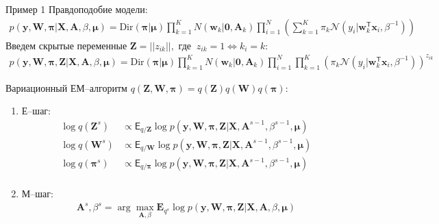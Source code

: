 \documentclass[9pt,pdf,hyperref={unicode}]{beamer}
\begin{document}
\begin{frame}{Пример 1}
\justifying
Правдоподобие модели:
	\begin{equation}
	\label{sl:3:eq:1}
		\begin{aligned}
			p(\textbf{y}, \textbf{W}, \bm{\pi}|\textbf{X}, \textbf{A}, \beta, \bm{\mu}) = \text{Dir}(\bm{\pi}|\bm{\mu})
			\prod_{k=1}^{K}N(\textbf{w}_k|\textbf{0}, \textbf{A}_k)
			\prod_{i=1}^{N}\left(\sum_{k=1}^{K}\pi_k\mathcal{N}(y_i|\textbf{w}_k^{\mathsf{T}}\textbf{x}_i, \beta^{-1})\right)
		\end{aligned}
	\end{equation}
Введем скрытые переменные $\textbf{Z} = ||z_{ik}||,$ где $~z_{ik} = 1 \Leftrightarrow k_i=k$:
	\begin{equation}
	\label{sl:3:eq:2}
		\begin{aligned}
			p(\textbf{y}, \textbf{W}, \bm{\pi}, \textbf{Z}|\textbf{X}, \textbf{A}, \beta, \bm{\mu}) = \text{Dir}(\bm{\pi}|\bm{\mu})
			\prod_{k=1}^{K}N(\textbf{w}_k|\textbf{0}, \textbf{A}_k)
			\prod_{i=1}^{N}\prod_{k=1}^{K}\left(\pi_k\mathcal{N}(y_i|\textbf{w}_k^{\mathsf{T}}\textbf{x}_i, \beta^{-1})\right)^{z_{ik}}
		\end{aligned}
	\end{equation}

Вариационный ЕМ--алгоритм $q\left(\textbf{Z}, \textbf{W}, \bm{\pi}\right) = q\left(\textbf{Z}\right)q\left(\textbf{W}\right)q\left(\bm{\pi}\right)$:
	\begin{enumerate}
		\item Е--шаг: 
			\begin{equation}
			\label{sl:3:eq:3}
				\begin{aligned}
					\log q\left(\textbf{Z}^{s}\right) &\propto \mathsf{E}_{q/\textbf{Z}}\log p(\textbf{y}, \textbf{W}, \bm{\pi}, \textbf{Z}|\textbf{X}, \textbf{A}^{s-1}, \beta^{s-1}, \bm{\mu})\\
					\log q\left(\textbf{W}^{s}\right) &\propto \mathsf{E}_{q/\textbf{W}}\log p(\textbf{y}, \textbf{W}, \bm{\pi}, \textbf{Z}|\textbf{X}, \textbf{A}^{s-1}, \beta^{s-1}, \bm{\mu})\\
					\log q\left(\bm{\pi}^{s}\right) &\propto \mathsf{E}_{q/\bm{\pi}}\log p(\textbf{y}, \textbf{W}, \bm{\pi}, \textbf{Z}|\textbf{X}, \textbf{A}^{s-1}, \beta^{s-1}, \bm{\mu})\\
				\end{aligned}
			\end{equation}
		\item М--шаг: 
			\begin{equation}
			\label{sl:3:eq:4}
				\begin{aligned}
					\textbf{A}^{s}, \beta^{s} = \arg\max_{\textbf{A}, \beta} \mathbf{E}_{q^{s}}\log p(\textbf{y}, \textbf{W}, \bm{\pi}, \textbf{Z}|\textbf{X}, \textbf{A}, \beta, \bm{\mu})
				\end{aligned}
			\end{equation}
	\end{enumerate}

\end{frame}
\end{document}
